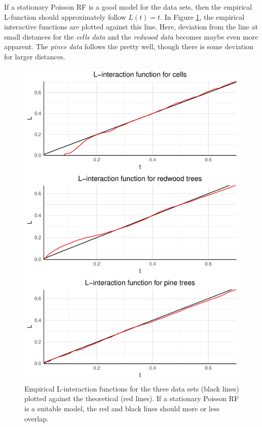 If a stationary Poisson RF is a good model for the data sets, then the empirical L-function should approximately follow $L(t) = t$. In Figure \ref{fig:L_emp_theor}, the empirical interactive functions are plotted against this line. Here, deviation from the line at small distances for the \textit{cells data} and the \textit{redwood data} becomes maybe even more apparent. The \textit{pines data} follows the pretty well, though there is some deviation for larger distances. 

\begin{figure}
    \centering
    \includegraphics[scale=0.95]{figures/prob1_L_emp_theor.pdf}
    \caption{Empirical L-interaction functions for the three data sets (black lines) plotted against the theoretical (red lines). If a stationary Poisson RF is a suitable model, the red and black lines should more or less overlap.}
    \label{fig:L_emp_theor}
\end{figure}


